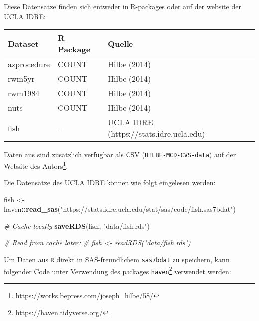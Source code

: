 \documentclass[ngerman,a4paper,]{scrartcl}
\newenvironment{Shaded}{\begin{snugshade}}{\end{snugshade}}
\newcommand{\CommentTok}[1]{\textcolor[rgb]{0.56,0.35,0.01}{\textit{#1}}}
\newcommand{\ControlFlowTok}[1]{\textcolor[rgb]{0.13,0.29,0.53}{\textbf{#1}}}
\newcommand{\DataTypeTok}[1]{\textcolor[rgb]{0.13,0.29,0.53}{#1}}
\newcommand{\KeywordTok}[1]{\textcolor[rgb]{0.13,0.29,0.53}{\textbf{#1}}}
\newcommand{\NormalTok}[1]{#1}
\newcommand{\OperatorTok}[1]{\textcolor[rgb]{0.81,0.36,0.00}{\textbf{#1}}}
\newcommand{\StringTok}[1]{\textcolor[rgb]{0.31,0.60,0.02}{#1}}
\renewcommand{\href}[2]{#2\footnote{\url{#1}}}
\let\rmarkdownfootnote\footnote%
\def\footnote{\protect\rmarkdownfootnote}
\theoremstyle{definition}
\theoremstyle{definition}
\theoremstyle{definition}
\theoremstyle{remark}
\begin{document}
Diese Datensätze finden sich entweder in R-packages oder auf der website der UCLA IDRE:

\begin{table}[H]
\centering
\begin{tabular}{lll}
\toprule
Dataset & R Package & Quelle\\
\midrule
azprocedure & COUNT & Hilbe (2014)\\
rwm5yr & COUNT & Hilbe (2014)\\
rwm1984 & COUNT & Hilbe (2014)\\
nuts & COUNT & Hilbe (2014)\\
fish & – & UCLA IDRE (https://stats.idre.ucla.edu)\\
\bottomrule
\end{tabular}
\end{table}

Daten aus \citet{hilbeModelingCountData2014} sind zusätzlich verfügbar als CSV (\texttt{HILBE-MCD-CVS-data}) auf \href{https://works.bepress.com/joseph_hilbe/58/}{der Website des Autors}.

Die Datensätze des UCLA IDRE können wie folgt eingelesen werden:

\begin{Shaded}
\begin{Highlighting}[]
\NormalTok{fish <-}\StringTok{ }\NormalTok{haven}\OperatorTok{::}\KeywordTok{read_sas}\NormalTok{(}\StringTok{"https://stats.idre.ucla.edu/stat/sas/code/fish.sas7bdat"}\NormalTok{)}

\CommentTok{# Cache locally}
\KeywordTok{saveRDS}\NormalTok{(fish, }\StringTok{"data/fish.rds"}\NormalTok{)}

\CommentTok{# Read from cache later:}
\CommentTok{# fish <- readRDS("data/fish.rds")}
\end{Highlighting}
\end{Shaded}

Um Daten aus \texttt{R} direkt in SAS-freundlichem \texttt{sas7bdat} zu speichern, kann folgender Code unter Verwendung des packages \href{https://haven.tidyverse.org/}{\texttt{haven}} verwendet werden:

\begin{Shaded}
\end{Shaded}
\end{document}
